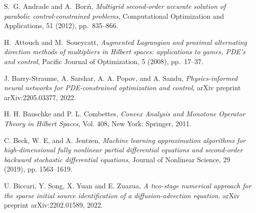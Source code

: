 \documentclass[final]{siamart171218}
\theoremstyle{remark}
\begin{document}

\begin{thebibliography}{10}
	
	{ S.~G. Andrade and A.~Borz{\`\i}}, {\em Multigrid second-order accurate
		solution of parabolic control-constrained problems}, Computational
	Optimization and Applications, 51 (2012), pp.~835--866.
	
	
{ H.~Attouch and M.~Soueycatt}, {\em Augmented Lagrangian and proximal alternating direction methods of multipliers in Hilbert spaces: applications to games, PDE's and control}, Pacific Journal of Optimization, 5 (2008),
pp.~17--37.

J. Barry-Straume, A. Sarshar, A. A. Popov, and A. Sandu,  {\em Physics-informed neural networks for PDE-constrained optimization and control}, arXiv preprint arXiv:2205.03377, 2022.


H. H. Bauschke and P. L. Combettes, {\em Convex Analysis and Monotone Operator Theory in Hilbert Spaces}, Vol. 408, New York: Springer, 2011.

C. Beck, W. E, and A. Jentzen, {\em Machine learning approximation algorithms for high-dimensional fully nonlinear partial differential equations and second-order backward
stochastic differential equations}, Journal of Nonlinear Science, 29 (2019), pp. 1563--1619.
%


U. Biccari, Y. Song, X. Yuan and E.  Zuazua, {\em A two-stage numerical approach for the sparse initial source identification of a diffusion-advection equation}. arXiv preprint arXiv:2202.01589, 2022.



\end{thebibliography}
\end{document}
